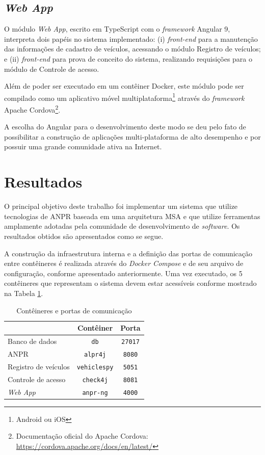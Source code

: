 \documentclass[12pt]{article}
\begin{document}
\subsection{\textit{Web App}}

O módulo \textit{Web App}, escrito em TypeScript com o \textit{framework} Angular 9, interpreta dois papéis no sistema implementado: (i) \textit{front-end} para a manutenção das informações de cadastro de veículos, acessando o módulo Registro de veículos; e (ii) \textit{front-end} para prova de conceito do sistema, realizando requisições para o módulo de Controle de acesso.

Além de poder ser executado em um contêiner Docker, este módulo pode ser compilado como um aplicativo móvel multiplataforma\footnote{Android ou iOS} através do \textit{framework} Apache Cordova\footnote{Documentação oficial do Apache Cordova: \url{https://cordova.apache.org/docs/en/latest/}}.

A escolha do Angular para o desenvolvimento deste modo se deu pelo fato de possibilitar a construção de aplicações multi-plataforma de alto desempenho e por possuir uma grande comunidade ativa na Internet.

\section{Resultados}

O principal objetivo deste trabalho foi implementar um sistema que utilize tecnologias de ANPR baseada em uma arquitetura MSA e que utilize ferramentas amplamente adotadas pela comunidade de desenvolvimento de \textit{software}. Os resultados obtidos são apresentados como se segue.

A construção da infraestrutura interna e a definição das portas de comunicação entre contêineres é realizada através do \textit{Docker Compose} e de seu arquivo de configuração, conforme apresentado anteriormente. Uma vez executado, os 5 contêineres que representam o sistema devem estar acessíveis conforme mostrado na Tabela \ref{table:container-table}.

\begin{table}[h!]
	\begin{center}
		\begin{tabular}{l|c|c}
			\hline
			\space & \textbf{Contêiner} & \textbf{Porta}\\
			\hline
			Banco de dados & \texttt{db} & \texttt{27017}\\
			ANPR & \texttt{alpr4j} & \texttt{8080}\\
			Registro de veículos & \texttt{vehiclespy} & \texttt{5051}\\
			Controle de acesso & \texttt{check4j} & \texttt{8081}\\
			\textit{Web App} & \texttt{anpr-ng} & \texttt{4000}\\
			\hline
		\end{tabular}
	\caption{Contêineres e portas de comunicação}
	\label{table:container-table}
	\end{center}
\end{table}
\end{document}
